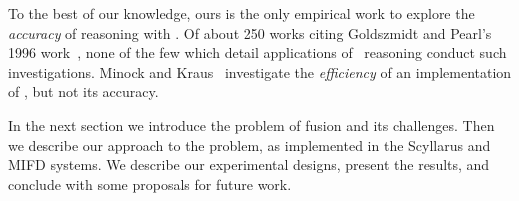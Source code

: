 To the best of our knowledge, ours is the only empirical work to explore the
\emph{accuracy} of reasoning with \zplus.
Of about 250 works citing Goldszmidt and Pearl's 1996
work~\cite{google-scholar-query}, none of the few which detail
applications of \zplus\ reasoning conduct such investigations.
%
Minock and Kraus~ investigate the
\emph{efficiency} of an implementation of \zplus,
but not its accuracy.
%
%

In the next section we introduce the problem of \ids fusion
and its challenges.  Then we describe our approach to the
problem, as implemented in the Scyllarus and MIFD systems.  We describe our
experimental designs, present the results, and conclude with some proposals for
future work.

